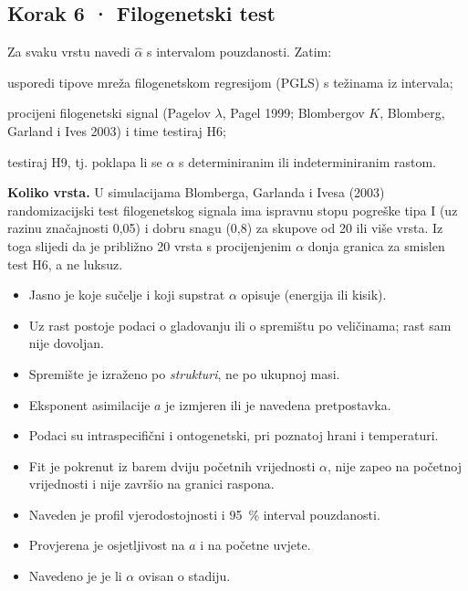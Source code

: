\subsection*{Korak 6 · Filogenetski test}
Za svaku vrstu navedi $\hat\alpha$ s intervalom pouzdanosti. Zatim:
\begin{enumerate*}[label=(\roman*)]
\item usporedi tipove mreža filogenetskom regresijom (PGLS) s težinama iz intervala;
\item procijeni filogenetski signal (Pagelov $\lambda$, Pagel 1999; Blombergov $K$, Blomberg, Garland i Ives 2003) i time testiraj H6;
\item testiraj H9, tj. poklapa li se $\alpha$ s determiniranim ili indeterminiranim rastom.
\end{enumerate*}

\textbf{Koliko vrsta.} U simulacijama Blomberga, Garlanda i Ivesa (2003) randomizacijski test filogenetskog signala ima ispravnu stopu pogreške tipa I (uz razinu značajnosti 0,05) i dobru snagu (0,8) za skupove od 20 ili više vrsta. Iz toga slijedi da je približno 20 vrsta s procijenjenim $\alpha$ donja granica za smislen test H6, a ne luksuz.

\begin{kljucno}
\begin{itemize}[label=$\square$,leftmargin=1.6em]
\item Jasno je koje sučelje i koji supstrat $\alpha$ opisuje (energija ili kisik).
\item Uz rast postoje podaci o gladovanju ili o spremištu po veličinama; rast sam nije dovoljan.
\item Spremište je izraženo po \emph{strukturi}, ne po ukupnoj masi.
\item Eksponent asimilacije $a$ je izmjeren ili je navedena pretpostavka.
\item Podaci su intraspecifični i ontogenetski, pri poznatoj hrani i temperaturi.
\item Fit je pokrenut iz barem dviju početnih vrijednosti $\alpha$, nije zapeo na početnoj vrijednosti i nije završio na granici raspona.
\item Naveden je profil vjerodostojnosti i 95~\% interval pouzdanosti.
\item Provjerena je osjetljivost na $a$ i na početne uvjete.
\item Navedeno je je li $\alpha$ ovisan o stadiju.
\end{itemize}
\end{kljucno}
